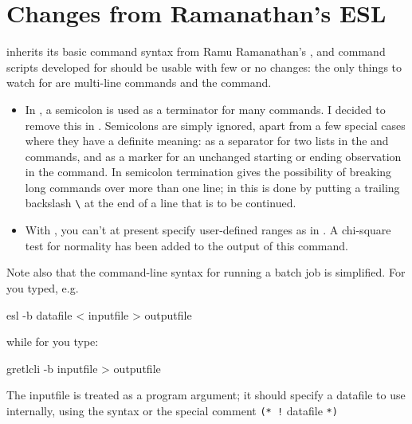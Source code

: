 \section{Changes from Ramanathan's ESL}
\label{cli-syntax}

 inherits its basic command syntax from Ramu
Ramanathan's , and command scripts developed for 
should be usable with few or no changes: the only things to watch for
are multi-line commands and the  command.
    
\begin{itemize}
\item In , a semicolon is used as a terminator for many
  commands.  I decided to remove this in . Semicolons
  are simply ignored, apart from a few special cases where they have a
  definite meaning: as a separator for two lists in the  and
   commands, and as a marker for an unchanged starting or
  ending observation in the  command. In  semicolon
  termination gives the possibility of breaking long commands over
  more than one line; in  this is done by putting a
  trailing backslash \verb+\+ at the end of a line that is to be
  continued.
\item With , you can't at present specify user-defined
  ranges as in .  A chi-square test for normality has been
  added to the output of this command.
\end{itemize}

Note also that the command-line syntax for running a batch job is
simplified. For  you typed, e.g.
      
\begin{code} 
        esl -b datafile < inputfile > outputfile
\end{code}
%
while for  you type:
%      
\begin{code}
	gretlcli -b inputfile > outputfile
\end{code}

The inputfile is treated as a program argument; it should specify a
datafile to use internally, using the syntax  or
the special comment \verb+(* !+ datafile \verb+*)+
    


